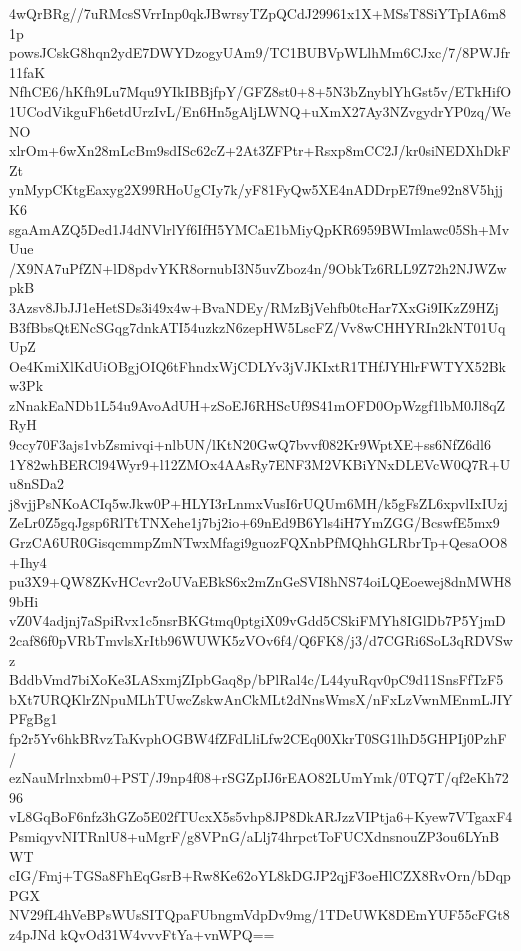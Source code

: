 4wQrBRg//7uRMcsSVrrInp0qkJBwrsyTZpQCdJ29961x1X+MSsT8SiYTpIA6m81p
powsJCskG8hqn2ydE7DWYDzogyUAm9/TC1BUBVpWLlhMm6CJxc/7/8PWJfr11faK
NfhCE6/hKfh9Lu7Mqu9YIkIBBjfpY/GFZ8st0+8+5N3bZnyblYhGst5v/ETkHifO
1UCodVikguFh6etdUrzIvL/En6Hn5gAljLWNQ+uXmX27Ay3NZvgydrYP0zq/WeNO
xlrOm+6wXn28mLcBm9sdISc62cZ+2At3ZFPtr+Rsxp8mCC2J/kr0siNEDXhDkFZt
ynMypCKtgEaxyg2X99RHoUgCIy7k/yF81FyQw5XE4nADDrpE7f9ne92n8V5hjjK6
sgaAmAZQ5Ded1J4dNVlrlYf6IfH5YMCaE1bMiyQpKR6959BWImlawc05Sh+MvUue
/X9NA7uPfZN+lD8pdvYKR8ornubI3N5uvZboz4n/9ObkTz6RLL9Z72h2NJWZwpkB
3Azsv8JbJJ1eHetSDs3i49x4w+BvaNDEy/RMzBjVehfb0tcHar7XxGi9IKzZ9HZj
B3fBbsQtENcSGqg7dnkATI54uzkzN6zepHW5LscFZ/Vv8wCHHYRIn2kNT01UqUpZ
Oe4KmiXlKdUiOBgjOIQ6tFhndxWjCDLYv3jVJKIxtR1THfJYHlrFWTYX52Bkw3Pk
zNnakEaNDb1L54u9AvoAdUH+zSoEJ6RHScUf9S41mOFD0OpWzgf1lbM0Jl8qZRyH
9ccy70F3ajs1vbZsmivqi+nlbUN/lKtN20GwQ7bvvf082Kr9WptXE+ss6NfZ6dl6
1Y82whBERCl94Wyr9+l12ZMOx4AAsRy7ENF3M2VKBiYNxDLEVcW0Q7R+Uu8nSDa2
j8vjjPsNKoACIq5wJkw0P+HLYI3rLnmxVusI6rUQUm6MH/k5gFsZL6xpvlIxIUzj
ZeLr0Z5gqJgsp6RlTtTNXehe1j7bj2io+69nEd9B6Yls4iH7YmZGG/BcswfE5mx9
GrzCA6UR0GisqcmmpZmNTwxMfagi9guozFQXnbPfMQhhGLRbrTp+QesaOO8+Ihy4
pu3X9+QW8ZKvHCcvr2oUVaEBkS6x2mZnGeSVI8hNS74oiLQEoewej8dnMWH89bHi
vZ0V4adjnj7aSpiRvx1c5nsrBKGtmq0ptgiX09vGdd5CSkiFMYh8IGlDb7P5YjmD
2caf86f0pVRbTmvlsXrItb96WUWK5zVOv6f4/Q6FK8/j3/d7CGRi6SoL3qRDVSwz
BddbVmd7biXoKe3LASxmjZIpbGaq8p/bPlRal4c/L44yuRqv0pC9d11SnsFfTzF5
bXt7URQKlrZNpuMLhTUwcZskwAnCkMLt2dNnsWmsX/nFxLzVwnMEnmLJIYPFgBg1
fp2r5Yv6hkBRvzTaKvphOGBW4fZFdLliLfw2CEq00XkrT0SG1lhD5GHPIj0PzhF/
ezNauMrlnxbm0+PST/J9np4f08+rSGZpIJ6rEAO82LUmYmk/0TQ7T/qf2eKh7296
vL8GqBoF6nfz3hGZo5E02fTUcxX5s5vhp8JP8DkARJzzVIPtja6+Kyew7VTgaxF4
PsmiqyvNITRnlU8+uMgrF/g8VPnG/aLlj74hrpctToFUCXdnsnouZP3ou6LYnBWT
cIG/Fmj+TGSa8FhEqGsrB+Rw8Ke62oYL8kDGJP2qjF3oeHlCZX8RvOrn/bDqpPGX
NV29fL4hVeBPsWUsSITQpaFUbngmVdpDv9mg/1TDeUWK8DEmYUF55cFGt8z4pJNd
kQvOd31W4vvvFtYa+vnWPQ==
